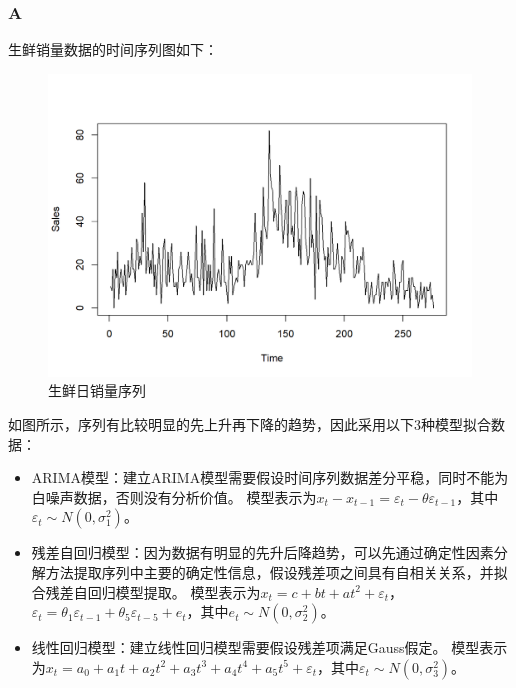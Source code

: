 \documentclass[12pt,a4paper]{article}
\begin{document}
    \title{}
    \date{}
    \author{姓名：\underline{刘哲}~~~~~~学号：\underline{2022103691}~~~~~~}
    \maketitle
    \section{}
    \vspace{10pt}
    \subsubsection*{A}
    生鲜销量数据的时间序列图如下：
    \begin{figure}[H]
        \centering
        \includegraphics[scale=0.8]{FreshTS.png}
        \caption*{生鲜日销量序列}
    \end{figure}
    如图所示，序列有比较明显的先上升再下降的趋势，因此采用以下3种模型拟合数据：
    \begin{itemize}
        \item ARIMA模型：建立ARIMA模型需要假设时间序列数据差分平稳，同时不能为白噪声数据，否则没有分析价值。
        模型表示为$x_t-x_{t-1}=\varepsilon_t-\theta\varepsilon_{t-1}$，其中$\varepsilon_t\sim N(0,\sigma_1^2)$。
        \item 残差自回归模型：因为数据有明显的先升后降趋势，可以先通过确定性因素分解方法提取序列中主要的确定性信息，假设残差项之间具有自相关关系，并拟合残差自回归模型提取。
        模型表示为$x_t=c+bt+at^2+\varepsilon_t$，$\varepsilon_t=\theta_1\varepsilon_{t-1}+\theta_5\varepsilon_{t-5}+e_t$，其中$e_t\sim N(0,\sigma_2^2)$。
        \item 线性回归模型：建立线性回归模型需要假设残差项满足Gauss假定。
        模型表示为$x_t=a_0+a_1t+a_2t^2+a_3t^3+a_4t^4+a_5t^5+\varepsilon_t$，其中$\varepsilon_t\sim N(0,\sigma_3^2)$。
    \end{itemize}
\end{document}
